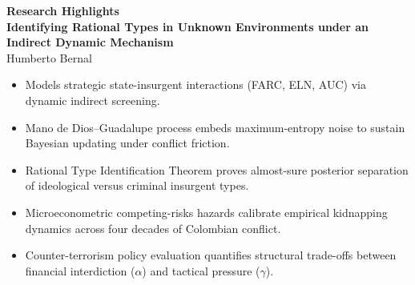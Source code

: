 \documentclass[12pt]{article}
\begin{document}
\doublespacing

\begin{center}
\textbf{Research Highlights} \\
\vspace{1em}
\textbf{Identifying Rational Types in Unknown Environments under an Indirect Dynamic Mechanism} \\
Humberto Bernal
\end{center}

\vspace{2em}

\begin{itemize}
    \item Models strategic state-insurgent interactions (FARC, ELN, AUC) via dynamic indirect screening.
    \item Mano de Dios--Guadalupe process embeds maximum-entropy noise to sustain Bayesian updating under conflict friction.
    \item Rational Type Identification Theorem proves almost-sure posterior separation of ideological versus criminal insurgent types.
    \item Microeconometric competing-risks hazards calibrate empirical kidnapping dynamics across four decades of Colombian conflict.
    \item Counter-terrorism policy evaluation quantifies structural trade-offs between financial interdiction ($\alpha$) and tactical pressure ($\gamma$).
\end{itemize}
\end{document}
